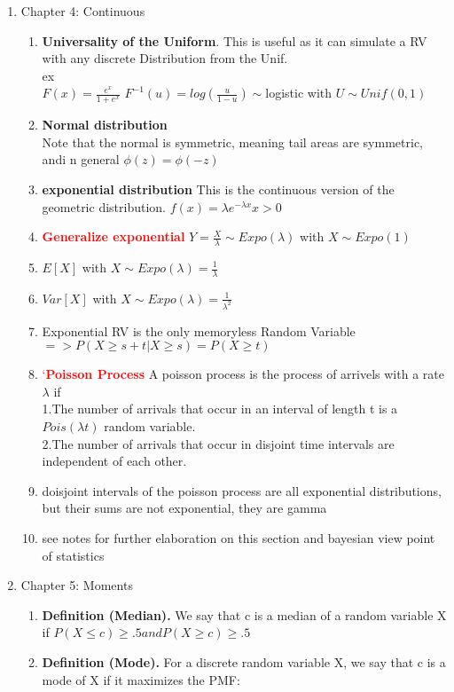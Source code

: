 \documentclass[11pt]{article}
\begin{document}
\begin{enumerate}
\begin{enumerate}
\end{enumerate}
\item Chapter 4: Continuous
\begin{enumerate}
	\item \textbf{Universality of the Uniform}. This is useful as it can simulate a RV with any discrete Distribution from the Unif.
	\\
	ex\\
	$F(x) = \frac{e^x}{1+e^x} \, \, F^{-1}(u) = log(\frac{u}{1-u}) \sim $logistic with $U \sim Unif(0,1)$ 
	\item \textbf{Normal distribution}\\
	Note that the normal is symmetric, meaning tail areas are symmetric, andi n general $\phi(z)=\phi(-z)$
	\item \textbf{exponential distribution} This is the continuous version of the geometric distribution. $f(x) = \lambda e^{-\lambda x} x>0$
	\item \textcolor{red}{\textbf{Generalize exponential  }}$Y = \frac{X}{\lambda} \sim Expo(\lambda)$ with $X \sim Expo(1)$
	\item $E[X]$ with  $X\sim Expo(\lambda) = \frac{1}{\lambda}$
	\item $Var[X]$ with $ X\sim Expo(\lambda) = \frac{1}{\lambda^2}$
	\item Exponential RV is the only memoryless Random Variable $=> P(X\ge s + t| X\ge s ) = P(X\ge t)$
	\item \textcolor{red}{`\textbf{Poisson Process}} A poisson process is the process of arrivels with a rate $\lambda$ if \\
	1.The number of arrivals that occur in an interval of length t is a $Pois(\lambda t)$ random variable.\\
	2.The number of arrivals that occur in disjoint time intervals are independent of each other.
	\item doisjoint intervals of the poisson process are all exponential distributions, but their sums are not exponential, they are gamma
	\item see notes for further elaboration on this section and bayesian view point of statistics
\end{enumerate}
\item Chapter 5: Moments
\begin{enumerate}
	\item \textbf{ Definition (Median).} We say that c is a median of a random variable X if $P(X \le c) \ge .5 and P(X \ge c) \ge .5$
	\item \textbf{Definition (Mode).} For a discrete random variable X, we say that c is a mode of X if it maximizes the PMF:

\end{enumerate}
\end{enumerate}
\end{document}
